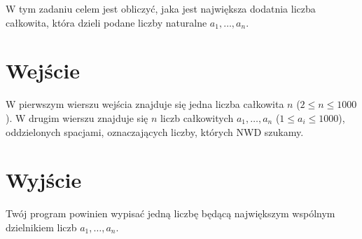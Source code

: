 \documentclass{spiral-kurs}
\begin{document}
\makeheader
%
    W tym zadaniu celem jest obliczyć, jaka jest największa dodatnia liczba całkowita,
    która dzieli podane liczby naturalne $a_1,\ldots,a_n$.

    \section{Wejście}
    W pierwszym wierszu wejścia znajduje się jedna liczba całkowita $n$
    ($2 \le n \le 1000$).
    W drugim wierszu znajduje się $n$ liczb całkowitych $a_1,\ldots,a_n$
    ($1 \le a_i \le 1000$), oddzielonych spacjami, oznaczających liczby,
    których NWD szukamy.
      
    \section{Wyjście}
    Twój program powinien wypisać jedną liczbę będącą największym wspólnym dzielnikiem
    liczb $a_1,\ldots,a_n$.



  
\end{document}
